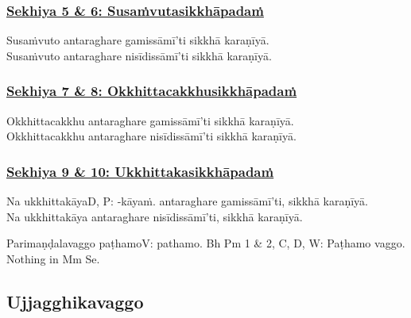 \subsubsection*{\hyperref[training5-6]{Sekhiya 5 \& 6: Susaṁvutasikkhāpadaṁ}}
\label{sekh5-6}

Susaṁvuto antaraghare gamissāmī'ti sikkhā karaṇīyā.\\
Susaṁvuto antaraghare nisīdissāmī'ti sikkhā karaṇīyā.



\subsubsection*{\hyperref[training7-8]{Sekhiya 7 \& 8: Okkhittacakkhusikkhāpadaṁ}}
\label{sekh7-8}

Okkhittacakkhu antaraghare gamissāmī'ti sikkhā karaṇīyā.\\
Okkhittacakkhu antaraghare nisīdissāmī'ti sikkhā karaṇīyā.



\subsubsection*{\hyperref[training9-10]{Sekhiya 9 \& 10: Ukkhittakasikkhāpadaṁ}}
\label{sekh9-10}

Na ukkhittakāya\makeatletter\hyperlink{endnote-appendix}\makeatother D, P: -kāyaṁ. antaraghare gamissāmī'ti, sikkhā karaṇīyā.\\
Na ukkhittakāya antaraghare nisīdissāmī'ti, sikkhā karaṇīyā.

\begin{center}
	Parimaṇḍalavaggo paṭhamo\makeatletter\hyperlink{endnote-appendix}\makeatother V: pathamo. Bh Pm 1 & 2, C, D, W: Paṭhamo vaggo. Nothing in Mm Se.
\end{center}



\subsection{Ujjagghikavaggo}


